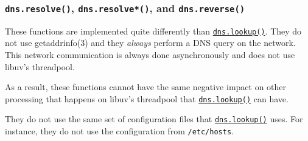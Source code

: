 \subsubsection{\texorpdfstring{\texttt{dns.resolve()},
\texttt{dns.resolve*()}, and
\texttt{dns.reverse()}}{dns.resolve(), dns.resolve*(), and dns.reverse()}}\label{dns.resolve-dns.resolve-and-dns.reverse}

These functions are implemented quite differently than
\hyperref[dnslookuphostname-options-callback]{\texttt{dns.lookup()}}.
They do not use getaddrinfo(3) and they \emph{always} perform a DNS
query on the network. This network communication is always done
asynchronously and does not use libuv's threadpool.

As a result, these functions cannot have the same negative impact on
other processing that happens on libuv's threadpool that
\hyperref[dnslookuphostname-options-callback]{\texttt{dns.lookup()}} can
have.

They do not use the same set of configuration files that
\hyperref[dnslookuphostname-options-callback]{\texttt{dns.lookup()}}
uses. For instance, they do not use the configuration from
\texttt{/etc/hosts}.
